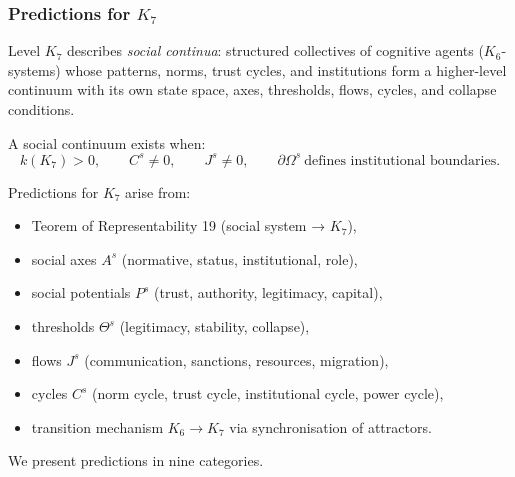 

\subsubsection{Predictions for \texorpdfstring{$K_7$}{K_7}}
\label{sec:predictions-k7}

Level $K_7$ describes \emph{social continua}: structured collectives of
cognitive agents ($K_6$-systems) whose patterns, norms, trust cycles,
and institutions form a higher-level continuum with its own state space,
axes, thresholds, flows, cycles, and collapse conditions.

A social continuum exists when:
\[
k(K_7) > 0,
\qquad 
C^s \neq 0,
\qquad
J^s \neq 0,
\qquad
\partial\Omega^s \ \text{defines institutional boundaries}.
\]

Predictions for $K_7$ arise from:
\begin{itemize}
    \item Teorem of Representability 19 (social system → $K_7$),
    \item social axes $A^s$ (normative, status, institutional, role),
    \item social potentials $P^s$ (trust, authority, legitimacy, capital),
    \item thresholds $\Theta^s$ (legitimacy, stability, collapse),
    \item flows $J^s$ (communication, sanctions, resources, migration),
    \item cycles $C^s$ (norm cycle, trust cycle, institutional cycle, power cycle),
    \item transition mechanism $K_6 \to K_7$ via synchronisation of attractors.
\end{itemize}

We present predictions in nine categories.

